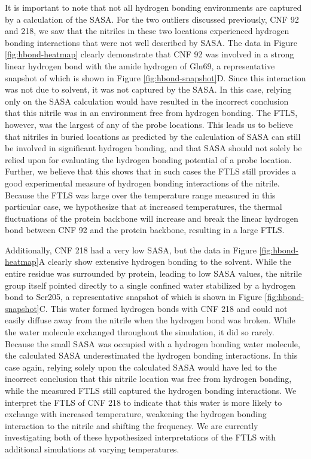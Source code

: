 It is important to note that not all hydrogen bonding environments are captured by a calculation of the SASA.
For the two outliers discussed previously, CNF 92 and 218, we saw that the nitriles in these two locations experienced hydrogen bonding interactions that were not well described by SASA.
The data in Figure \ref{fig:hbond-heatmap} clearly demonstrate that CNF 92 was involved in a strong linear hydrogen bond with the amide hydrogen of Gln69, a representative snapshot of which is shown in Figure \ref{fig:hbond-snapshot}D.
Since this interaction was not due to solvent, it was not captured by the SASA.
In this case, relying only on the SASA calculation would have resulted in the incorrect conclusion that this nitrile was in an environment free from hydrogen bonding.
The FTLS, however, was the largest of any of the probe locations.
This leads us to believe that nitriles in buried locations as predicted by the calculation of SASA can still be involved in significant hydrogen bonding, and that SASA should not solely be relied upon for evaluating the hydrogen bonding potential of a probe location.
Further, we believe that this shows that in such cases the FTLS still provides a good experimental measure of hydrogen bonding interactions of the nitrile.
Because the FTLS was large over the temperature range measured in this particular case, we hypothesize that at increased temperatures, the thermal fluctuations of the protein backbone will increase and break the linear hydrogen bond between CNF 92 and the protein backbone, resulting in a large FTLS. 

Additionally, CNF 218 had a very low SASA, but the data in Figure \ref{fig:hbond-heatmap}A clearly show extensive hydrogen bonding to the solvent.
While the entire residue was surrounded by protein, leading to low SASA values, the nitrile group itself pointed directly to a single confined water stabilized by a hydrogen bond to Ser205, a representative snapshot of which is shown in Figure \ref{fig:hbond-snapshot}C.
This water formed hydrogen bonds with CNF 218 and could not easily diffuse away from the nitrile when the hydrogen bond was broken.
While the water molecule exchanged throughout the simulation, it did so rarely.
Because the small SASA was occupied with a hydrogen bonding water molecule, the calculated SASA underestimated the hydrogen bonding interactions.
In this case again, relying solely upon the calculated SASA would have led to the incorrect conclusion that this nitrile location was free from hydrogen bonding, while the measured FTLS still captured the hydrogen bonding interactions.
We interpret the FTLS of CNF 218 to indicate that this water is more likely to exchange with increased temperature, weakening the hydrogen bonding interaction to the nitrile and shifting the frequency.
We are currently investigating both of these hypothesized interpretations of the FTLS with additional simulations at varying temperatures.

